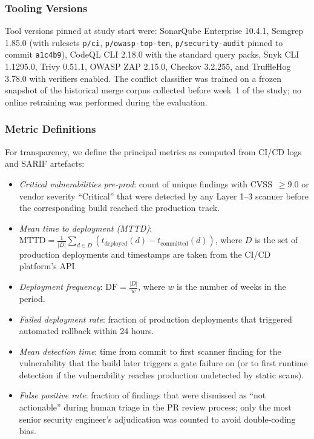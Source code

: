 \documentclass{ieeeaccess}
\begin{document}
\subsubsection{Tooling Versions}
\label{sec:eval-versions}
Tool versions pinned at study start were: SonarQube Enterprise 10.4.1, Semgrep 1.85.0 (with rulesets \texttt{p/ci}, \texttt{p/owasp-top-ten}, \texttt{p/security-audit} pinned to commit \texttt{a1c4b9}), CodeQL CLI 2.18.0 with the standard query packs, Snyk CLI 1.1295.0, Trivy 0.51.1, OWASP ZAP 2.15.0, Checkov 3.2.255, and TruffleHog 3.78.0 with verifiers enabled. The conflict classifier was trained on a frozen snapshot of the historical merge corpus collected before week~1 of the study; no online retraining was performed during the evaluation.

\subsubsection{Metric Definitions}
For transparency, we define the principal metrics as computed from CI/CD logs and SARIF artefacts:
\begin{itemize}
\item \textit{Critical vulnerabilities pre-prod}: count of unique findings with CVSS~$\geq 9.0$ or vendor severity ``Critical'' that were detected by any Layer 1--3 scanner before the corresponding build reached the production track.
\item \textit{Mean time to deployment (MTTD)}: $\mathrm{MTTD} = \frac{1}{|D|}\sum_{d \in D}(t_{\mathrm{deployed}}(d) - t_{\mathrm{committed}}(d))$, where $D$ is the set of production deployments and timestamps are taken from the CI/CD platform's API.
\item \textit{Deployment frequency}: $\mathrm{DF} = \frac{|D|}{w}$, where $w$ is the number of weeks in the period.
\item \textit{Failed deployment rate}: fraction of production deployments that triggered automated rollback within 24 hours.
\item \textit{Mean detection time}: time from commit to first scanner finding for the vulnerability that the build later triggers a gate failure on (or to first runtime detection if the vulnerability reaches production undetected by static scans).
\item \textit{False positive rate}: fraction of findings that were dismissed as ``not actionable'' during human triage in the PR review process; only the most senior security engineer's adjudication was counted to avoid double-coding bias.
\end{itemize}
\end{document}
